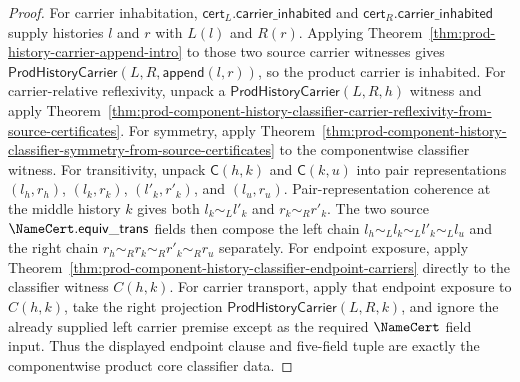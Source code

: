 \begin{proof}
For carrier inhabitation, $\mathsf{cert}_L.\mathsf{carrier\_inhabited}$ and
$\mathsf{cert}_R.\mathsf{carrier\_inhabited}$ supply histories $l$ and $r$
with $L(l)$ and $R(r)$. Applying
Theorem~\ref{thm:prod-history-carrier-append-intro} to those two source
carrier witnesses gives
$\mathsf{ProdHistoryCarrier}(L,R,\mathsf{append}(l,r))$, so the product
carrier is inhabited. For carrier-relative reflexivity, unpack a
$\mathsf{ProdHistoryCarrier}(L,R,h)$ witness and apply
Theorem~\ref{thm:prod-component-history-classifier-carrier-reflexivity-from-source-certificates}.
For symmetry, apply
Theorem~\ref{thm:prod-component-history-classifier-symmetry-from-source-certificates}
to the componentwise classifier witness. For transitivity, unpack
$\mathsf{C}(h,k)$ and
$\mathsf{C}(k,u)$ into pair representations $(l_h,r_h)$, $(l_k,r_k)$,
$(l'_k,r'_k)$, and $(l_u,r_u)$. Pair-representation coherence at the middle
history $k$ gives both $l_k\sim_L l'_k$ and $r_k\sim_R r'_k$. The two source
$\NameCert.\mathsf{equiv\_trans}$ fields then compose the left chain
$l_h\sim_L l_k\sim_L l'_k\sim_L l_u$ and the right chain
$r_h\sim_R r_k\sim_R r'_k\sim_R r_u$ separately. For endpoint exposure, apply
Theorem~\ref{thm:prod-component-history-classifier-endpoint-carriers} directly
to the classifier witness $C(h,k)$. For carrier transport, apply that endpoint
exposure to $C(h,k)$, take the right projection
$\mathsf{ProdHistoryCarrier}(L,R,k)$, and ignore the already supplied left
carrier premise except as the required $\NameCert$ field input. Thus the
displayed endpoint clause and five-field tuple are exactly the componentwise
product core classifier data.
\end{proof}

